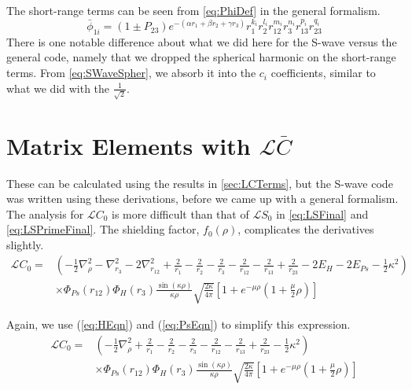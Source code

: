 \documentclass[Dissertation.tex]{subfiles}
\begin{document}
The short-range terms can be seen from \cref{eq:PhiDef} in the general formalism.
\begin{equation}
\label{eq:PhiDefS}
  \bar{\phi}_{1i} = \left(1 \pm P_{23}\right) e^{-(\alpha r_1 + \beta r_2 + \gamma r_3)}
  r_1^{k_i} r_2^{l_i} r_{12}^{m_i} r_3^{n_i} r_{13}^{p_i} r_{23}^{q_i}
\end{equation}
There is one notable difference about what we did here for the S-wave versus the general code, namely that we dropped the spherical harmonic on the short-range terms. From \cref{eq:SWaveSpher}, we absorb it into the $c_i$ coefficients, similar to what we did with the $\frac{1}{\sqrt{2}}$.


\section{Matrix Elements with \texorpdfstring{$\mathcal{L}\bar{C}$}{LC}}
\label{sec:LCElements}

These can be calculated using the results in \cref{sec:LCTerms}, but the S-wave code was written using these derivations, before we came up with a general formalism. 
The analysis for $\mathcal{L}C_0$ is more difficult than that of $\mathcal{L}S_0$ in \cref{eq:LSFinal} and \cref{eq:LSPrimeFinal}. The shielding factor, $f_0(\rho)$, complicates the derivatives slightly.
\begin{align}
\mathcal{L}C_0 = & \left(-\frac{1}{2}\nabla_\rho^2 - \nabla_{r_3}^2 - 2\nabla_{r_{12}}^2 + \frac{2}{r_1} - \frac{2}{r_2} - \frac{2}{r_3} - \frac{2}{r_{12}} - \frac{2}{r_{13}} + \frac{2}{r_{23}} - 2 E_H - 2 E_{Ps} - \frac{1}{2}\kappa^2 \right) \nonumber \\
 & \times \Phi_{Ps}(r_{12}) \Phi_H(r_3) \frac{\sin(\kappa\rho)}{\kappa\rho} \sqrt{\frac{2\kappa}{4\pi}} \left[1 + e^{-\mu\rho} \left(1 + \frac{\mu}{2} \rho \right) \right]
\label{eq:LC1}
\end{align}

\noindent Again, we use (\ref{eq:HEqn}) and (\ref{eq:PsEqn}) to simplify this expression.
\begin{align}
\mathcal{L}C_0 = & \left(-\frac{1}{2}\nabla_\rho^2 + \frac{2}{r_1} - \frac{2}{r_2} - \frac{2}{r_3} - \frac{2}{r_{12}} - \frac{2}{r_{13}} + \frac{2}{r_{23}}  - \frac{1}{2}\kappa^2\right) \nonumber \\
 & \times \Phi_{Ps}(r_{12}) \Phi_H(r_3) \frac{\sin(\kappa\rho)}{\kappa\rho} \sqrt{\frac{2\kappa}{4\pi}} \left[1 + e^{-\mu\rho} \left(1 + \frac{\mu}{2} \rho \right) \right]
\label{eq:LC2}
\end{align}
\end{document}
